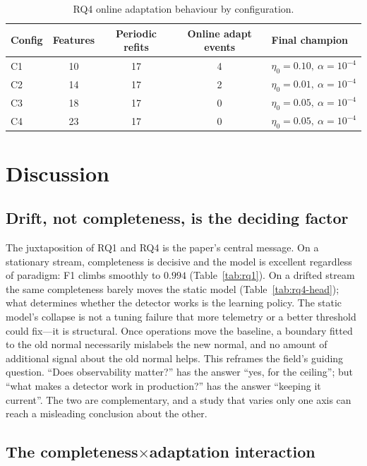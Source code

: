 \documentclass[acmsmall]{acmart}
\begin{document}
\begin{table}[t]
\caption{RQ4 online adaptation behaviour by configuration.}\label{tab:rq4-adapt}
\begin{tabular}{@{}lcccl@{}}
\toprule
Config & Features & Periodic refits & Online adapt events & Final champion \\
\midrule
C1 & 10 & 17 & 4 & $\eta_0{=}0.10,\ \alpha{=}10^{-4}$ \\
C2 & 14 & 17 & 2 & $\eta_0{=}0.01,\ \alpha{=}10^{-4}$ \\
C3 & 18 & 17 & 0 & $\eta_0{=}0.05,\ \alpha{=}10^{-4}$ \\
C4 & 23 & 17 & 0 & $\eta_0{=}0.05,\ \alpha{=}10^{-4}$ \\
\bottomrule
\end{tabular}
\end{table}

\section{Discussion}\label{sec:discussion}

\subsection{Drift, not completeness, is the deciding factor}\label{sec:disc-drift}

The juxtaposition of RQ1 and RQ4 is the paper's central message. On a stationary stream, completeness is decisive and the model is excellent regardless of paradigm: F1 climbs smoothly to $0.994$ (Table~\ref{tab:rq1}). On a drifted stream the same completeness barely moves the static model (Table~\ref{tab:rq4-head}); what determines whether the detector works is the learning policy. The static model's collapse is not a tuning failure that more telemetry or a better threshold could fix---it is structural. Once operations move the baseline, a boundary fitted to the old normal necessarily mislabels the new normal, and no amount of additional signal about the old normal helps. This reframes the field's guiding question. ``Does observability matter?'' has the answer ``yes, for the ceiling''; but ``what makes a detector work in production?'' has the answer ``keeping it current''. The two are complementary, and a study that varies only one axis can reach a misleading conclusion about the other.

\subsection{The completeness$\times$adaptation interaction}\label{sec:disc-interaction}
\end{document}

